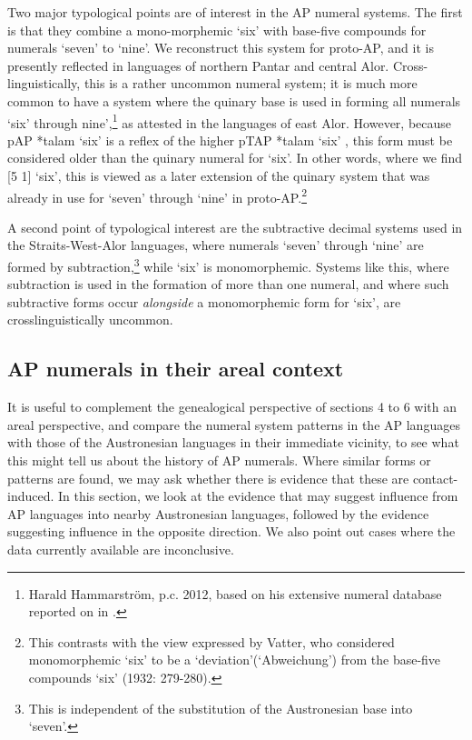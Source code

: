 Two major typological points are of interest in the AP numeral systems. The first is that they combine a mono-morphemic `six' with base-five compounds for numerals `seven' to `nine'. We reconstruct this system for proto-AP, and it is presently reflected in languages of northern Pantar and central Alor. Cross-linguistically, this is a rather uncommon numeral system; it is much more common to have a system where the quinary base is used in forming all numerals `six' through nine',\footnote{Harald Hammarstr\"om, p.c. 2012, based on his extensive numeral database reported on in \citet{Hammarstrom2010}.} as attested in the languages of east Alor. However, because pAP *talam `six' is a reflex of the higher pTAP *talam `six' \citep{SchapperEtAlTVtimor},   this form must be considered older than the quinary numeral for `six'. In other words, where we find [5 1] `six', this is viewed as a later extension of the quinary system that was already in use for `seven' through `nine' in proto-AP.\footnote{This contrasts with the view expressed by Vatter, who considered monomorphemic `six' to be a `deviation'(`Abweichung') from the base-five compounds `six' (1932: 279-280).}\nocite{Vatter1932}

A second point of typological interest are the subtractive decimal systems used in the Straits-West-Alor languages, where numerals `seven' through `nine' are formed by subtraction,\footnote{This is independent of the substitution of the Austronesian base into `seven'.} while `six' is monomorphemic. Systems like this, where subtraction is used in the formation of more than one numeral, and where such subtractive forms occur \textit{alongside} a monomorphemic form for `six', are crosslinguistically uncommon. 

\subsection{AP numerals in their areal context}\label{sec:6:7.2}
It is useful to complement the genealogical perspective of sections 4 to 6 with an areal perspective, and compare the numeral system patterns in the AP  languages with those of the Austronesian languages in their immediate vicinity, to see what this might tell us about the history of AP numerals. Where similar forms or patterns are found, we may ask whether there is evidence that these are contact-induced. In this section, we look at the evidence that may suggest influence from AP languages into nearby Austronesian languages, followed by the evidence suggesting influence in the opposite direction. We also point out cases where the data currently available are inconclusive. 


